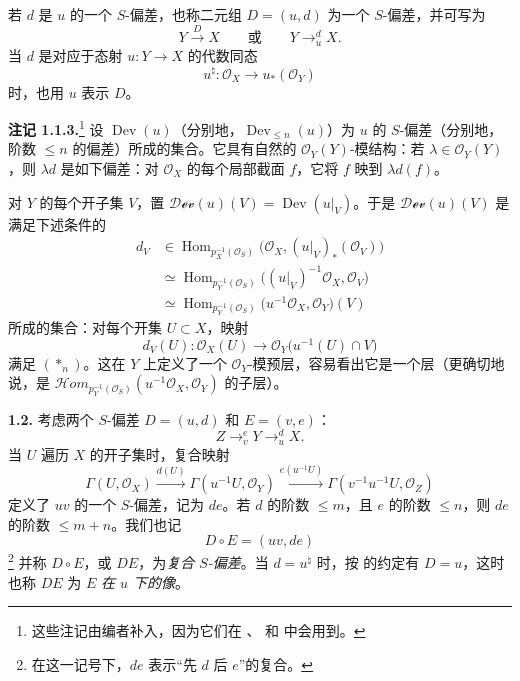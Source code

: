 若 \(d\) 是 \(u\) 的一个 \(S\)-偏差，也称二元组 \(D=(u,d)\) 为一个 \(S\)-偏差，并可写为
\[
  Y\xrightarrow{D}X
  \qquad\text{或}\qquad
  Y\mathop{\longrightarrow}^{d}_{u}X.
\]
当 \(d\) 是对应于态射 \(u:Y\to X\) 的代数同态
\[
  u^\natural:\mathcal O_X\longrightarrow u_*(\mathcal O_Y)
\]
时，也用 \(u\) 表示 \(D\)。

\medskip
\noindent\textbf{注记 1.1.3.}\footnote{这些注记由编者补入，因为它们在 、 和  中会用到。}
\label{sga3:VIIA:1.1.3}
设 \(\operatorname{Dev}(u)\)（分别地，\(\operatorname{Dev}_{\leq n}(u)\)）为 \(u\) 的 \(S\)-偏差（分别地，阶数 \(\leq n\) 的偏差）所成的集合。它具有自然的 \(\mathcal O_Y(Y)\)-模结构：若 \(\lambda\in\mathcal O_Y(Y)\)，则 \(\lambda d\) 是如下偏差：对 \(\mathcal O_X\) 的每个局部截面 \(f\)，它将 \(f\) 映到 \(\lambda d(f)\)。

对 \(Y\) 的每个开子集 \(V\)，置 \(\mathcal{Dev}(u)(V)=\operatorname{Dev}(u|_V)\)。于是 \(\mathcal{Dev}(u)(V)\) 是满足下述条件的
\begin{align*}
 d_V&\in
 \operatorname{Hom}_{p_X^{-1}(\mathcal O_S)}
   \bigl(\mathcal O_X,(u|_V)_*(\mathcal O_V)\bigr)\\
 &\simeq
 \operatorname{Hom}_{p_Y^{-1}(\mathcal O_S)}
   \bigl((u|_V)^{-1}\mathcal O_X,\mathcal O_V\bigr)\\
 &\simeq
 \operatorname{Hom}_{p_Y^{-1}(\mathcal O_S)}
   \bigl(u^{-1}\mathcal O_X,\mathcal O_Y\bigr)(V)
\end{align*}
所成的集合：对每个开集 \(U\subset X\)，映射
\[
 d_V(U):\mathcal O_X(U)\longrightarrow
 \mathcal O_Y\bigl(u^{-1}(U)\cap V\bigr)
\]
满足 \((\ast_n)\)。这在 \(Y\) 上定义了一个 \(\mathcal O_Y\)-模预层，容易看出它是一个层（更确切地说，是 \(\mathcal Hom_{p_Y^{-1}(\mathcal O_S)}
  (u^{-1}\mathcal O_X,\mathcal O_Y)\) 的子层）。

\medskip
\noindent\textbf{1.2.}
\label{sga3:VIIA:1.2}
考虑两个 \(S\)-偏差 \(D=(u,d)\) 和 \(E=(v,e)\)：
\[
  Z\mathop{\longrightarrow}^{e}_{v}Y
  \mathop{\longrightarrow}^{d}_{u}X.
\]
当 \(U\) 遍历 \(X\) 的开子集时，复合映射
\[
 \Gamma(U,\mathcal O_X)
 \xrightarrow{d(U)}
 \Gamma(u^{-1}U,\mathcal O_Y)
 \xrightarrow{e(u^{-1}U)}
 \Gamma(v^{-1}u^{-1}U,\mathcal O_Z)
\]
定义了 \(uv\) 的一个 \(S\)-偏差，记为 \(de\)。若 \(d\) 的阶数 \(\leq m\)，且 \(e\) 的阶数 \(\leq n\)，则 \(de\) 的阶数 \(\leq m+n\)。我们也记
\begin{equation}
  D\circ E=(uv,de)
  \tag{\(\dagger\)}
  \label{sga3:VIIA:eq:composition}
\end{equation}
\footnote{在这一记号下，\(de\) 表示“先 \(d\) 后 \(e\)”的复合。}
并称 \(D\circ E\)，或 \(DE\)，为\emph{复合 \(S\)-偏差}。当 \(d=u^\natural\) 时，按  的约定有 \(D=u\)，这时也称 \(DE\) 为 \(E\) \emph{在 \(u\) 下的像}。


